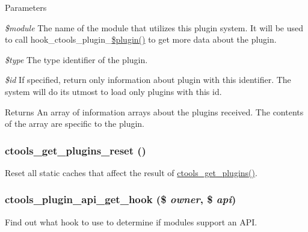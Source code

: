 \begin{DoxyParams}{Parameters}
\item[{\em \$module}]The name of the module that utilizes this plugin system. It will be used to call hook\_\-ctools\_\-plugin\_\-\hyperlink{ruleset_8inc_ada8a7130088351710bb02ed622d6bf65}{\$plugin()} to get more data about the plugin. \item[{\em \$type}]The type identifier of the plugin. \item[{\em \$id}]If specified, return only information about plugin with this identifier. The system will do its utmost to load only plugins with this id.\end{DoxyParams}
\begin{DoxyReturn}{Returns}
An array of information arrays about the plugins received. The contents of the array are specific to the plugin. 
\end{DoxyReturn}
\hypertarget{ctools_2includes_2plugins_8inc_a9af4fc3f7a11693d67599827eaac90a2}{
\subsubsection[{ctools\_\-get\_\-plugins\_\-reset}]{\setlength{\rightskip}{0pt plus 5cm}ctools\_\-get\_\-plugins\_\-reset ()}}
\label{ctools_2includes_2plugins_8inc_a9af4fc3f7a11693d67599827eaac90a2}
Reset all static caches that affect the result of \hyperlink{ctools_2includes_2plugins_8inc_aad93a9aa7b585e33d6696ac0b9ec42fc}{ctools\_\-get\_\-plugins()}. \hypertarget{ctools_2includes_2plugins_8inc_a7211172b4adf55371fb7881bbb74c353}{
\subsubsection[{ctools\_\-plugin\_\-api\_\-get\_\-hook}]{\setlength{\rightskip}{0pt plus 5cm}ctools\_\-plugin\_\-api\_\-get\_\-hook (\$ {\em owner}, \/  \$ {\em api})}}
\label{ctools_2includes_2plugins_8inc_a7211172b4adf55371fb7881bbb74c353}
Find out what hook to use to determine if modules support an API.

